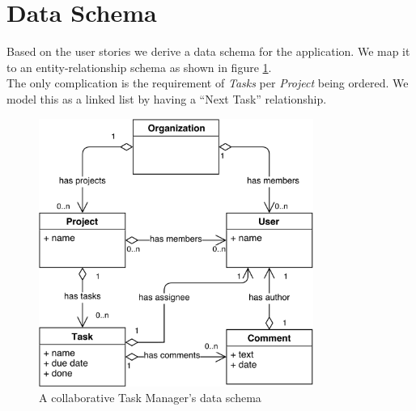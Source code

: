 \section{Data Schema}
Based on the user stories we derive a data schema for the application.
We map it to an entity-relationship schema as shown in figure \ref{fig:tasks-data-schema}.\\
The only complication is the requirement of \emph{Tasks} per \emph{Project} being ordered.
We model this as a linked list by having a ``Next Task'' relationship.

\begin{figure}
\centering
\includegraphics[width=0.8\textwidth]{img/tasks-schema}
\caption{A collaborative Task Manager's data schema}
\label{fig:tasks-data-schema}
\end{figure}

